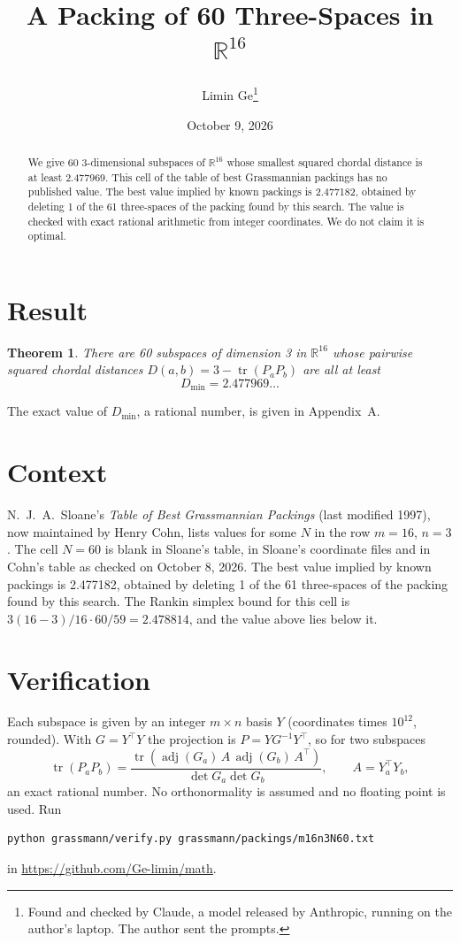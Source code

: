 \documentclass[11pt,a4paper]{article}
\title{A Packing of 60 Three-Spaces in $\mathbb{R}^{16}$}
\author{Limin Ge\thanks{Found and checked by Claude, a model released by Anthropic, running on the author's laptop. The author sent the prompts.}}
\date{October 9, 2026}
\newtheorem*{theorem}{Theorem}
\begin{document}
\maketitle
\begin{abstract}
We give 60 3-dimensional subspaces of $\mathbb{R}^{16}$ whose smallest squared chordal distance is at least 2.477969. This cell of the table of best Grassmannian packings has no published value. The best value implied by known packings is 2.477182, obtained by deleting 1 of the 61 three-spaces of the packing found by this search. The value is checked with exact rational arithmetic from integer coordinates. We do not claim it is optimal.
\end{abstract}

\section{Result}
\begin{theorem}
There are 60 subspaces of dimension 3 in $\mathbb{R}^{16}$ whose pairwise squared chordal distances $D(a,b) = 3 - \operatorname{tr}(P_aP_b)$ are all at least
\[ D_{\min} = 2.477969\ldots \]
\end{theorem}
The exact value of $D_{\min}$, a rational number, is given in Appendix~A.


\section{Context}
N.~J.~A.~Sloane's \emph{Table of Best Grassmannian Packings} (last modified 1997), now maintained by Henry Cohn, lists values for some $N$ in the row $m=16$, $n=3$. The cell $N=60$ is blank in Sloane's table, in Sloane's coordinate files and in Cohn's table as checked on October 8, 2026. The best value implied by known packings is 2.477182, obtained by deleting 1 of the 61 three-spaces of the packing found by this search. The Rankin simplex bound for this cell is $3(16-3)/16\cdot 60/59 = 2.478814$, and the value above lies below it.


\section{Verification}
Each subspace is given by an integer $m\times n$ basis $Y$ (coordinates times $10^{12}$, rounded). With $G=Y^\top Y$ the projection is $P=YG^{-1}Y^\top$, so for two subspaces
\[ \operatorname{tr}(P_aP_b)=\frac{\operatorname{tr}(\operatorname{adj}(G_a)\,A\,\operatorname{adj}(G_b)\,A^\top)}{\det G_a\det G_b},\qquad A=Y_a^\top Y_b, \]
an exact rational number. No orthonormality is assumed and no floating point is used. Run
\begin{verbatim}
python grassmann/verify.py grassmann/packings/m16n3N60.txt
\end{verbatim}
in \url{https://github.com/Ge-limin/math}.
\end{document}

